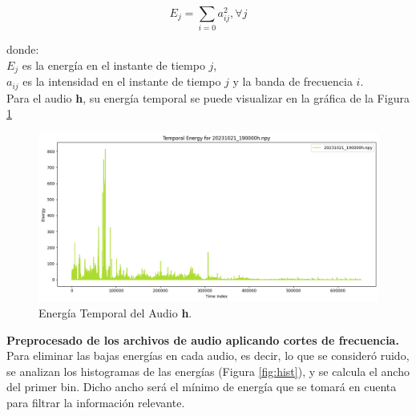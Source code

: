 \documentclass[a4paper,10pt,twocolumn]{article}
\begin{document}
\begin{equation*}
	E_j = \sum_{i=0} a_{ij}^{2}, \forall j
\end{equation*}
    

donde:\\
$E_j$ es la energía en el instante de tiempo $j$,\\
$a_{ij}$ es la intensidad en el instante de tiempo $j$ y la banda de frecuencia $i$.\\

Para el audio \textbf{h}, su energía temporal se puede visualizar en la gráfica de la Figura \ref{fig:energy}\\

\begin{figure}[h!]
    \centering
    \includegraphics[width=\columnwidth]{assets/temp_energy.png}
    \caption{Energía Temporal del Audio \textbf{h}.}
    \label{fig:energy}
\end{figure}


\textbf{Preprocesado de los archivos de audio aplicando cortes de frecuencia.}\\

Para eliminar las bajas energías en cada audio, es decir, lo que se consideró ruido, se analizan los histogramas de las energías (Figura \ref{fig:hist}),
y se calcula el ancho del primer bin. Dicho ancho será el mínimo de energía que se tomará en cuenta para filtrar la información relevante.\\
\end{document}
